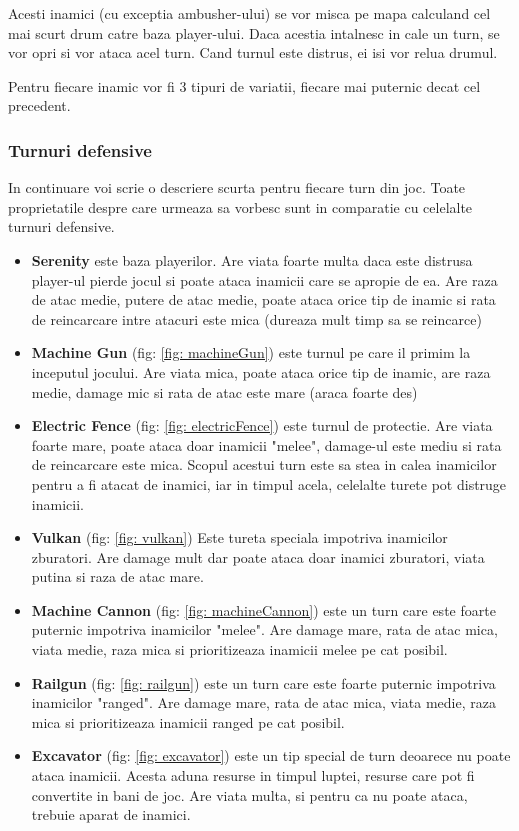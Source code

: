 \documentclass[12pt, a4paper]{article}
\begin{document}
	Acesti inamici (cu exceptia ambusher-ului) se vor misca pe mapa calculand cel mai scurt drum catre baza player-ului. Daca acestia intalnesc in cale un turn, se vor opri si vor ataca acel turn. Cand turnul este distrus, ei isi vor relua drumul.
	
	Pentru fiecare inamic vor fi 3 tipuri de variatii, fiecare mai puternic decat cel precedent.
	
	
	
	\subsubsection{Turnuri defensive}
	In continuare voi scrie o descriere scurta pentru fiecare turn din joc. Toate proprietatile despre care urmeaza sa vorbesc sunt in comparatie cu celelalte turnuri defensive.
	\begin{itemize}
		\item \textbf{Serenity} este baza playerilor. Are viata foarte multa daca este distrusa player-ul pierde jocul si poate ataca inamicii care se apropie de ea. Are raza de atac medie, putere de atac medie, poate ataca orice tip de inamic si rata de reincarcare intre atacuri este mica (dureaza mult timp sa se reincarce)
		\item \textbf{Machine Gun} (fig: \ref{fig: machineGun}) este turnul pe care il primim la inceputul jocului. Are viata mica, poate ataca orice tip de inamic, are raza medie, damage mic si rata de atac este mare (araca foarte des)
		\item \textbf{Electric Fence} (fig: \ref{fig: electricFence}) este turnul de protectie. Are viata foarte mare, poate ataca doar inamicii "melee", damage-ul este mediu si rata de reincarcare este mica. Scopul acestui turn este sa stea in calea inamicilor pentru a fi atacat de inamici, iar in timpul acela, celelalte turete pot distruge inamicii.
		\item \textbf{Vulkan} (fig: \ref{fig: vulkan}) Este tureta speciala impotriva inamicilor zburatori. Are damage mult dar poate ataca doar inamici zburatori, viata putina si raza de atac mare.
		\item \textbf{Machine Cannon} (fig: \ref{fig: machineCannon}) este un turn care este foarte puternic impotriva inamicilor "melee". Are damage mare, rata de atac mica, viata medie, raza mica si prioritizeaza inamicii melee pe cat posibil.
		\item \textbf{Railgun} (fig: \ref{fig: railgun}) este un turn care este foarte puternic impotriva inamicilor "ranged". Are damage mare, rata de atac mica, viata medie, raza mica si prioritizeaza inamicii ranged pe cat posibil.
		\item \textbf{Excavator} (fig: \ref{fig: excavator}) este un tip special de turn deoarece nu poate ataca inamicii. Acesta aduna resurse in timpul luptei, resurse care pot fi convertite in bani de joc. Are viata multa, si pentru ca nu poate ataca, trebuie aparat de inamici.
	\end{itemize}
	
\end{document}
